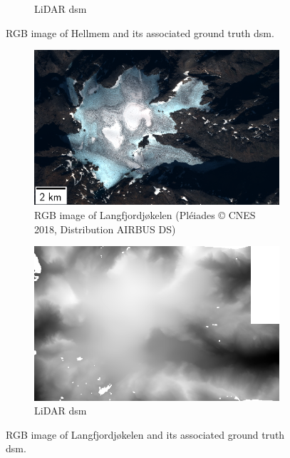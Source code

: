 \begin{figure}
\begin{subfigure}[t]{0.48\linewidth}
        \caption{LiDAR \acrshort{dsm}}
        \label{fig:miniature_Hellmem_gt}
    \end{subfigure}
    \caption{RGB image of Hellmem and its associated ground truth \acrshort{dsm}.}
    \label{fig:miniature_Hellmem}
\end{figure}

\begin{figure}
    \centering
    \begin{subfigure}[t]{0.48\linewidth}
        \flushleft
        \includegraphics[width=\linewidth]{Images/Chap_6/miniature_Langfjordjokelen.png}
        \caption{RGB image of Langfjordjøkelen (Pléiades © CNES 2018, Distribution AIRBUS DS)}
        \label{fig:miniature_Langfjordjokelen_rgb}
    \end{subfigure}\hfill
    \begin{subfigure}[t]{0.48\linewidth}
        \flushright
        \includegraphics[width=\linewidth]{Images/Chap_6/miniature_Langfjordjokelen_gt.png}
        \caption{LiDAR \acrshort{dsm}}
        \label{fig:miniature_Langfjordjokelen_gt}
    \end{subfigure}
    \caption{RGB image of Langfjordjøkelen and its associated ground truth \acrshort{dsm}.}
    \label{fig:miniature_Langfjordjokelen}
\end{figure}

